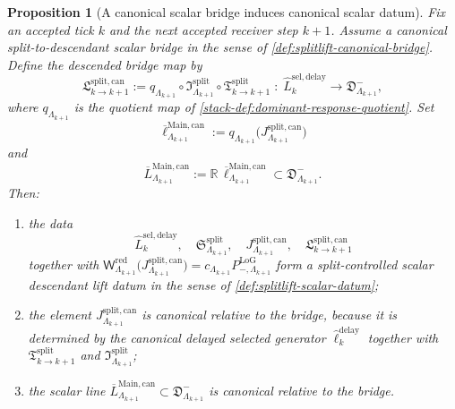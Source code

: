 \documentclass[11pt]{article}
\theoremstyle{definition}
\theoremstyle{plain}
\newtheorem{proposition}[definition]{Proposition}
\theoremstyle{remark}
\newcommand{\1}{\mathbf 1}
\begin{document}
\begin{proposition}[A canonical scalar bridge induces canonical scalar datum]
\label{prop:splitlift-canonical-datum}
Fix an accepted tick \(k\) and the next accepted receiver step \(k+1\).
Assume a canonical split-to-descendant scalar bridge in the sense of
\cref{def:splitlift-canonical-bridge}.
Define the descended bridge map by
\[
\mathfrak L^{\mathrm{split,can}}_{k\to k+1}
:=
q_{\Lambda_{k+1}}
\circ
\mathfrak I^{\mathrm{split}}_{\Lambda_{k+1}}
\circ
\mathfrak T^{\mathrm{split}}_{k\to k+1}
\;:\;
\widehat L^{\mathrm{sel,delay}}_k
\longrightarrow
\mathfrak D^-_{\Lambda_{k+1}},
\]
where \(q_{\Lambda_{k+1}}\) is the quotient map of
\cref{stack-def:dominant-response-quotient}.
Set
\[
\overline\ell^{\mathrm{Main,can}}_{\Lambda_{k+1}}
:=
q_{\Lambda_{k+1}}
\!\bigl(
J^{\mathrm{split,can}}_{\Lambda_{k+1}}
\bigr)
\]
and
\[
\overline L^{\mathrm{Main,can}}_{\Lambda_{k+1}}
:=
\mathbb R\,\overline\ell^{\mathrm{Main,can}}_{\Lambda_{k+1}}
\subset
\mathfrak D^-_{\Lambda_{k+1}}.
\]
Then:
\begin{enumerate}[leftmargin=2em]
\item the data
  \[
  \widehat L^{\mathrm{sel,delay}}_k,\quad
  \mathfrak S^{\mathrm{split}}_{\Lambda_{k+1}},\quad
  J^{\mathrm{split,can}}_{\Lambda_{k+1}},\quad
  \mathfrak L^{\mathrm{split,can}}_{k\to k+1}
  \]
  together with
  \(
  \mathsf W^{\mathrm{red}}_{\Lambda_{k+1}}
  \!\bigl(
  J^{\mathrm{split,can}}_{\Lambda_{k+1}}
  \bigr)
  =
  c_{\Lambda_{k+1}}P^{\mathrm{LoG}}_{-,\Lambda_{k+1}}
  \)
  form a split-controlled scalar descendant lift datum in the sense of
  \cref{def:splitlift-scalar-datum};
\item the element
  \(
  J^{\mathrm{split,can}}_{\Lambda_{k+1}}
  \)
  is canonical relative to the bridge, because it is determined by the canonical delayed selected
  generator
  \(
  \widehat\ell^{\mathrm{delay}}_k
  \)
  together with
  \(
  \mathfrak T^{\mathrm{split}}_{k\to k+1}
  \)
  and
  \(
  \mathfrak I^{\mathrm{split}}_{\Lambda_{k+1}}
  \);
\item the scalar line
  \(
  \overline L^{\mathrm{Main,can}}_{\Lambda_{k+1}}
  \subset
  \mathfrak D^-_{\Lambda_{k+1}}
  \)
  is canonical relative to the bridge.
\end{enumerate}
\end{proposition}
\end{document}
